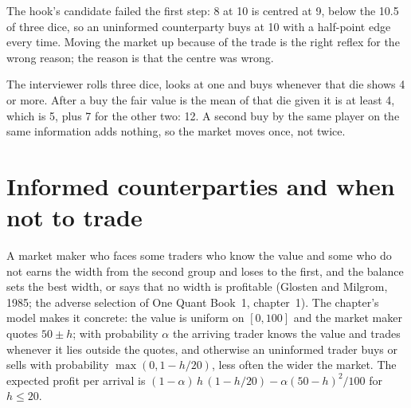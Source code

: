 The hook's candidate failed the first step: 8 at 10 is centred at 9, below the 10.5 of three dice, so an
uninformed counterparty buys at 10 with a half-point edge every time. Moving the market up because of the trade
is the right reflex for the wrong reason; the reason is that the centre was wrong.

\begin{example}\label{ex:iv:betting-and-market-making-games:informed}
The interviewer rolls three dice, looks at one and buys whenever that die shows 4 or more. After a buy the fair
value is the mean of that die given it is at least 4, which is 5, plus 7 for the other two: 12. A second buy by
the same player on the same information adds nothing, so the market moves once, not twice.
\end{example}

\section{Informed counterparties and when not to trade}

A market maker who faces some traders who know the value and some who do not earns the width from the second
group and loses to the first, and the balance sets the best width, or says that no width is profitable (Glosten
and Milgrom, 1985; the adverse selection of One Quant Book~1, chapter~1). The chapter's model makes it concrete: the
value is uniform on $[0, 100]$ and the market maker quotes $50 \pm h$; with probability $\alpha$ the arriving trader
knows the value and trades whenever it lies outside the quotes, and otherwise an uninformed trader buys or sells
with probability $\max(0, 1 - h/20)$, less often the wider the market. The expected profit per arrival is
$(1-\alpha)\,h\,(1 - h/20) - \alpha(50 - h)^2/100$ for $h \le 20$.

